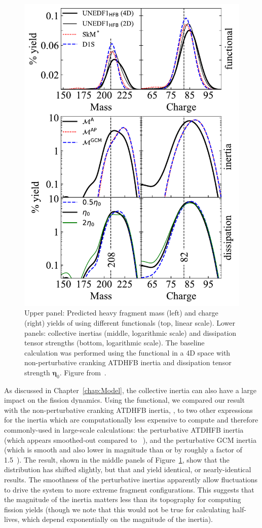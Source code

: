 \begin{figure}
	\centering
	\includegraphics[width=0.7\linewidth]{TeX_files/294Og_compare_all}
	\caption{Upper panel: Predicted heavy fragment mass (left) and charge (right) yields of \Og{} using different functionals (top, linear scale). Lower panels: collective inertias (middle, logarithmic scale) and dissipation tensor strengths (bottom, logarithmic scale). The baseline calculation was performed using the \hfb{} functional in a 4D space with non-perturbative cranking ATDHFB inertia and dissipation tensor strength $\mathbf{\eta}_0$. Figure from~\cite{matheson2019}.}
	\label{fig:294ogcompareall}
\end{figure}

As discussed in Chapter~\ref{chap:Model}, the collective inertia can also have a large impact on the fission dynamics. Using the {\hfb} functional, we compared our result with the non-perturbative cranking ATDHFB inertia, {\MATDHF}, to two other expressions for the inertia which are computationally less expensive to compute and therefore commonly-used in large-scale calculations: the perturbative ATDHFB inertia {\MATDHFp} (which appears smoothed-out compared to {\MATDHF}~\cite{giuliani2018b}), and the perturbative GCM inertia {\MGCMp} (which is smooth and also lower in magnitude than {\MATDHF} or {\MATDHFp} by roughly a factor of 1.5~\cite{giuliani2018b}). The result, shown in the middle panels of Figure~\ref{fig:294ogcompareall}, show that the distribution has shifted slightly, but that {\MATDHFp} and {\MGCMp} yield identical, or nearly-identical results. The smoothness of the perturbative inertias apparently allow fluctuations to drive the system to more extreme fragment configurations. This suggests that the magnitude of the inertia matters less than its topography for computing fission yields (though we note that this would not be true for calculating half-lives, which depend exponentially on the magnitude of the inertia).

